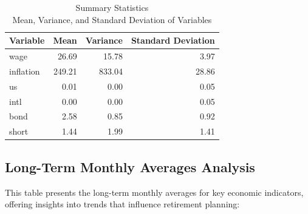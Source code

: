 \documentclass[
  letterpaper,
  DIV=11,
  numbers=noendperiod]{scrartcl}
\begin{document}
\begin{table}
\caption*{
{\large Summary Statistics} \\ 
{\small Mean, Variance, and Standard Deviation of Variables}
} 
\fontsize{12.0pt}{14.4pt}\selectfont
\begin{tabular*}{525pt}{@{\extracolsep{\fill}}lrrr}
\toprule
Variable & Mean & Variance & Standard Deviation \\ 
\midrule\addlinespace[2.5pt]
wage & 26.69 & 15.78 & 3.97 \\ 
inflation & 249.21 & 833.04 & 28.86 \\ 
us & 0.01 & 0.00 & 0.05 \\ 
intl & 0.00 & 0.00 & 0.05 \\ 
bond & 2.58 & 0.85 & 0.92 \\ 
short & 1.44 & 1.99 & 1.41 \\ 
\bottomrule
\end{tabular*}
\end{table}

\subsection{Long-Term Monthly Averages
Analysis}\label{long-term-monthly-averages-analysis}

This table presents the long-term monthly averages for key economic
indicators, offering insights into trends that influence retirement
planning:
\end{document}
